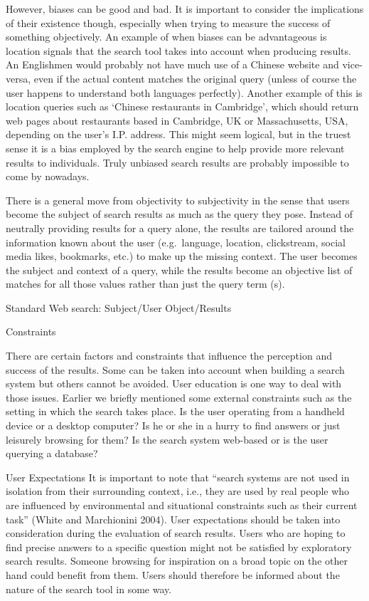However, biases can be good and bad. It is important to consider the implications of their existence though, especially when trying to measure the success of something objectively. An example of when biases can be advantageous is location signals that the search tool takes into account when producing results. An Englishmen would probably not have much use of a Chinese website and vice-versa, even if the actual content matches the original query (unless of course the user happens to understand both languages perfectly). Another example of this is location queries such as `Chinese restaurants in Cambridge', which should return web pages about restaurants based in Cambridge, UK or Massachusetts, USA, depending on the user’s I.P. address.  This might seem logical, but in the truest sense it is a bias employed by the search engine to help provide more relevant results to individuals. Truly unbiased search results are probably impossible to come by nowadays.

There is a general move from objectivity to subjectivity in the sense that users become the subject of search results as much as the query they pose. Instead of neutrally providing results for a query alone, the results are tailored around the information known about the user (e.g.\ language, location, clickstream, social media likes, bookmarks, etc.) to make up the missing context. The user becomes the subject and context of a query, while the results become an objective list of matches for all those values rather than just the query term (s).

Standard Web search:  Subject/User  Object/Results

Constraints

There are certain factors and constraints that influence the perception and success of the results. Some can be taken into account when building a search system but others cannot be avoided. User education is one way to deal with those issues. Earlier we briefly mentioned some external constraints such as the setting in which the search takes place. Is the user operating from a handheld device or a desktop computer? Is he or she in a hurry to find answers or just leisurely browsing for them? Is the search system web-based or is the user querying a database?

User Expectations  It is important to note that ``search systems are not used in isolation from their surrounding context, i.e., they are used by real people who are influenced by environmental and situational constraints such as their current task'' (White and Marchionini 2004). User expectations should be taken into consideration during the evaluation of search results. Users who are hoping to find precise answers to a specific question might not be satisfied by exploratory search results. Someone browsing for inspiration on a broad topic on the other hand could benefit from them. Users should therefore be informed about the nature of the search tool in some way.

